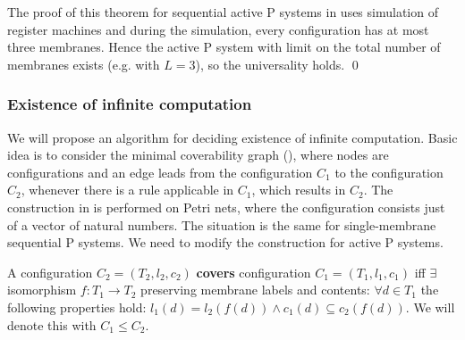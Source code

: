 \begin{dokaz}
  The proof of this theorem for sequential active P systems in \cite{Ibarra05Active} uses simulation of register machines and during the simulation, every configuration has at most three membranes. Hence the active P system with limit on the total number of membranes exists (e.g. with $L=3$), so the universality holds.
  \qed
\end{dokaz}

\subsubsection{Existence of infinite computation} %
\label{ssub:existence_of_infinite_computation}

We will propose an algorithm for deciding existence of infinite computation. Basic idea is to consider the minimal coverability graph (\cite{Rozenberg93MinimalCoverabilityGraph}), where nodes are configurations and an edge leads from the configuration $C_1$ to the configuration $C_2$, whenever there is a rule applicable in $C_1$, which results in $C_2$. The construction in \cite{Rozenberg93MinimalCoverabilityGraph} is performed on Petri nets, where the configuration consists just of a vector of natural numbers. The situation is the same for single-membrane sequential P systems. We need to modify the construction for active P systems.

\begin{definition}
  A configuration $C_2 = (T_2, l_2, c_2)$ {\bf covers} configuration $C_1 = (T_1, l_1, c_1)$ iff $\exists$ isomorphism $f: T_1\rightarrow T_2$ preserving membrane labels and contents: $\forall d\in T_1$ the following properties hold: $l_1(d)=l_2(f(d))\wedge c_1(d)\subseteq c_2(f(d))$. We will denote this with $C_1\leq C_2$.
\end{definition}

